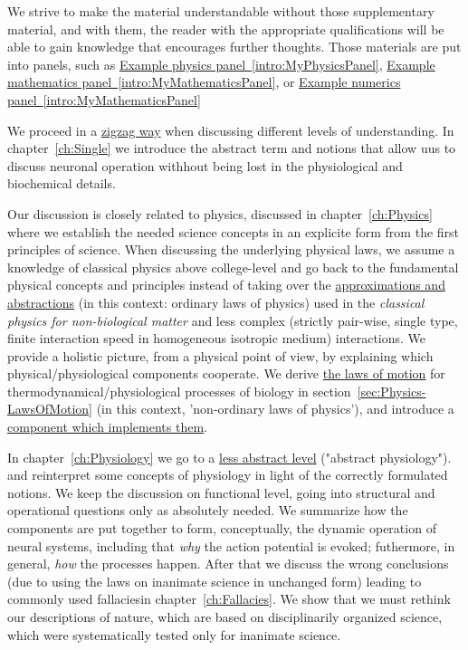  We strive to make the material understandable without those supplementary material, and with them, the reader with the appropriate qualifications
will be able to gain knowledge that encourages further thoughts.
Those materials are put into panels, such as
\hyperlink{intro:MyPhysicsPanel}
{Example physics panel~\ref{intro:MyPhysicsPanel}},
\hyperlink{intro:MyMathematicsPanel}
{Example mathematics panel~\ref{intro:MyMathematicsPanel}}, or
\hyperlink{intro:MyNumericsPanel}
{Example numerics panel~\ref{intro:MyMathematicsPanel}}

                                                                                                       
We proceed in a \hyperlink{zigzagdiscussion}{zigzag way}
when discussing different levels of understanding.
In chapter~\ref{ch:Single} we introduce the abstract
term and notions that  allow uus to discuss neuronal operation withhout being lost in the physiological and 
biochemical details.


Our discussion is closely related to %
{physics}, discussed in chapter~\ref{ch:Physics}
where we establish the needed science
concepts in an explicite form from the first principles of science.
When discussing the underlying physical laws,
we assume a knowledge of classical physics above college-level 
and go back to the fundamental physical concepts and principles instead of taking over the
\hyperlink{Abstractions}
{approximations and abstractions} (in this context: ordinary laws of physics)
used in the \textit{classical physics for non-biological matter} and
less complex (strictly pair-wise, single type, finite  interaction speed in
homogeneous isotropic medium) interactions.
We provide a holistic picture,
from a physical point of view, by explaining which physical/physiological components cooperate.
We derive \hyperlink{PhysicsLawsOfMotion}
{the laws of motion} for thermodynamical/physiological processes of biology in section~\ref{sec:Physics-LawsOfMotion} (in this context, 'non-ordinary laws of physics'), 
and introduce a \hyperlink{atomic_layer}
{component which implements them}.

In chapter~\ref{ch:Physiology} we go to a \hyperlink{AbstractPhysiology}
{less abstract level} ("abstract physiology").
and reinterpret some concepts of physiology in light of the correctly formulated notions.
We keep the discussion on functional level,
going into structural and operational questions only
as absolutely needed.
We summarize
how the components are put together to form, conceptually, 
the dynamic operation of neural systems, including that \textit{why}
{the action potential} is evoked; futhermore, in general, \textit{how} the processes happen.
After that we discuss the wrong conclusions (due to using the laws on inanimate science in unchanged form) leading to commonly used fallaciesin chapter~\ref{ch:Fallacies}.
We show that we must rethink our descriptions
of nature, which are based on disciplinarily organized science,
which were systematically tested only for inanimate science.


